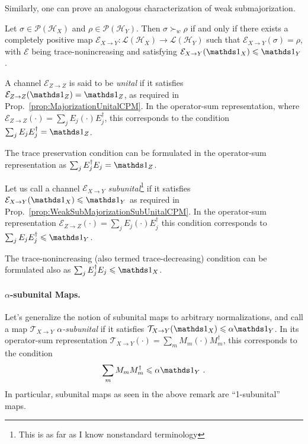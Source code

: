 \documentclass[12pt,a4paper]{article}
\def\Hs{\mathscr{H}}%
\newcommand{\LOps}{\mathscr{L}}
\newcommand{\POps}{\mathscr{P}}
\begin{document}
Similarly, one can prove an analogous characterization of weak submajorization.
\begin{prop}
  \label{prop:WeakSubMajorizationSubUnitalCPM}
  Let $\sigma\in\POps(\Hs_X)$ and $\rho\in\POps(\Hs_Y)$. Then $\sigma\succ_w\rho$ if and only if
  there exists a completely positive map $\mathcal{E}_{X\rightarrow Y} : \LOps(\Hs_X)\rightarrow\LOps(\Hs_Y)$
  such that $\mathcal{E}_{X\rightarrow Y}(\sigma) = \rho$, with $\mathcal{E}$ being trace-nonincreasing and
  satisfying $\mathcal{E}_{X\rightarrow Y}(\Ident_X)\leqslant \Ident_Y$.
\end{prop}

\begin{remark}
  \label{rem:AboutUnitalCPMs}
  A channel $\mathcal{E}_{Z\rightarrow Z}$ is said to be {\em unital} if it satisfies
  $\mathcal{E}_{Z\rightarrow Z}(\Ident_Z) = \Ident_Z$, as required in Prop.~\ref{prop:MajorizationUnitalCPM}. In
  the operator-sum representation, where
  $\mathcal{E}_{Z\rightarrow Z}(\cdot) = \sum_j E_j\left(\cdot\right)E_j^\dagger$, this corresponds to the condition
  $\sum_j E_j E_j^\dagger = \Ident_Z$.

  The trace preservation condition can be formulated in the operator-sum representation as
  $\sum_j E_j^\dagger E_j = \Ident_Z$.

  Let us call a channel $\mathcal{E}_{X\rightarrow Y}$ {\em subunital}\footnote{This is as far as I know
    nonstandard terminology} if it satisfies $\mathcal{E}_{X\rightarrow Y}(\Ident_X) \leqslant \Ident_Y$ as
  required in Prop.~\ref{prop:WeakSubMajorizationSubUnitalCPM}. In the operator-sum representation
  $\mathcal{E}_{Z\rightarrow Z}(\cdot) = \sum_j E_j\left(\cdot\right)E_j^\dagger$ this condition corresponds
  to $\sum_j E_j E_j^\dagger \leqslant \Ident_Y$.

  The trace-nonincreasing (also termed trace-decreasing) condition can be formulated also as
  $\sum_j E_j^\dagger E_j \leqslant \Ident_X$.
\end{remark}

\paragraph{$\alpha$-subunital Maps.} Let's generalize the notion of subunital maps to arbitrary normalizations,
and call a map $\mathcal{T}_{X\rightarrow Y}$ {\em $\alpha$-subunital} if it satisfies
$\mathcal{T}_{X\rightarrow Y}(\Ident_X) \leqslant \alpha \Ident_Y$. In its operator-sum representation
$\mathcal{T}_{X\rightarrow Y}(\cdot) = \sum_m M_m \left(\cdot\right) M_m^\dagger$, this corresponds to the
condition
\begin{align}
  \label{eq:lambdaSubUnital}
  \sum_m M_m M_m^\dagger \leqslant \alpha \Ident_Y\ .
\end{align}
In particular, subunital maps as seen in the above remark are ``1-subunital'' maps.
\end{document}

